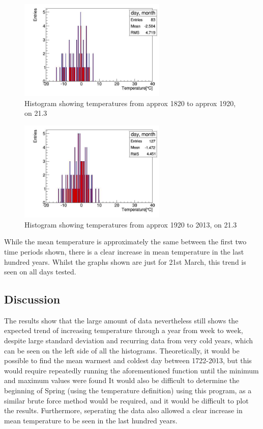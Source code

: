 \documentclass[a4paper,10pt,oneside]{article}
\begin{document}
\begin{figure}[!ht]
\begin{center}
 \includegraphics[width=7cm]{../Code/2.jpg}
 \caption{Histogram showing temperatures from approx 1820 to approx 1920, on 21.3}
 \label{fig:two}
 \end{center}
\end{figure}

\begin{figure}[!ht]
\begin{center}
 \includegraphics[width=7cm]{../Code/3.jpg}
 \caption{Histogram showing temperatures from approx 1920 to 2013, on 21.3}
 \label{fig:three}
 \end{center}
\end{figure}

While the mean temperature is approximately the same between the first two time periods
shown, there is a clear increase in mean temperature in the last hundred years. Whilst the graphs
shown are just for 21st March, this trend is seen on all days tested.


\subsection{Discussion}
\label{sec:conc}

The results show that the large amount of data nevertheless still shows the expected trend of increasing temperature through a year from week
to week, despite large standard deviation and recurring data from very cold years, which can be seen on
the left side of all the histograms. Theoretically, it would be possible to find the mean warmest and coldest day between 1722-2013,
but this would require repeatedly running the aforementioned function until the minimum and maximum values were found
It would also be difficult to determine the beginning of Spring (using the temperature definition) using this program,
as a similar brute force method would be required, and it would be difficult to plot the results. Furthermore, seperating
the data also allowed a clear increase in mean temperature to be seen in the last hundred years.






 
\end{document}

